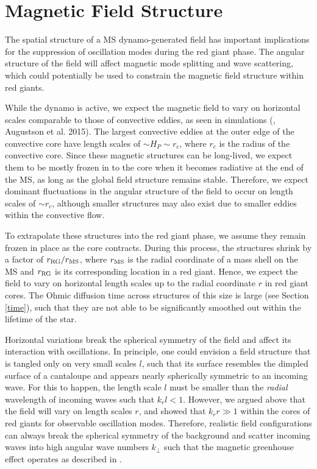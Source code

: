 \section{Magnetic Field Structure}
\label{fieldstruc}

The spatial structure of a MS dynamo-generated field has important implications for the suppression of oscillation modes during the red giant phase.
The angular structure of the field will affect magnetic mode splitting and wave scattering, which could potentially be used to constrain the magnetic field structure within red giants.

While the dynamo is active, we expect the magnetic field to vary on horizontal scales comparable to those of convective eddies, as seen in simulations (\citealt{Featherstone_2009}, Augustson et al. 2015). The largest convective eddies at the outer edge of the convective core have length scales of $\sim \! H_P \sim \! r_c$, where $r_c$ is the radius of the convective core. Since these magnetic structures can be long-lived, we expect them to be mostly frozen in to the core when it becomes radiative at the end of the MS, as long as the global field structure remains stable. Therefore, we expect dominant fluctuations in the angular structure of the field to occur on length scales of $\sim \! r_c$, although smaller structures may also exist due to smaller eddies within the convective flow.

To extrapolate these structures into the red giant phase, we assume they remain frozen in place as the core contracts. During this process, the structures shrink by a factor of $r_{\rm RG}/r_{\rm MS}$, where $r_{\rm MS}$ is the radial coordinate of a mass shell on the MS and $r_{\rm RG}$ is its corresponding location in a red giant. Hence, we expect the field to vary on horizontal length scales up to the radial coordinate $r$ in red giant cores. The Ohmic diffusion time across structures of this size is large (see Section \ref{time}), such that they are not able to be significantly smoothed out within the lifetime of the star.

Horizontal variations break the spherical symmetry of the field and affect its interaction with oscillations. In principle, one could envision a field structure that is tangled only on very small scales $l$, such that its surface resembles the dimpled surface of a cantaloupe and appears nearly spherically symmetric to an incoming wave. For this to happen, the length scale $l$ must be smaller than the {\it radial} wavelength of incoming waves such that $k_r l < 1$. However, we argued above that the field will vary on length scales $r$, and \cite{Fuller_2015} showed that $k_r r \gg 1$ within the cores of red giants for observable oscillation modes. Therefore, realistic field configurations can always break the spherical symmetry of the background and scatter incoming waves into high angular wave numbers $k_\perp$ such that the magnetic greenhouse effect operates as described in \cite{Fuller_2015}.
